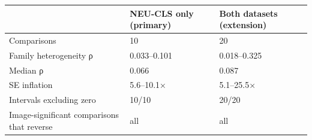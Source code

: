 \begin{tabular}{lll}
\toprule
 & NEU-CLS only (primary) & Both datasets (extension) \\
\midrule
Comparisons & 10 & 20 \\
Family heterogeneity ρ & 0.033–0.101 & 0.018–0.325 \\
Median ρ & 0.066 & 0.087 \\
SE inflation & 5.6–10.1× & 5.1–25.5× \\
Intervals excluding zero & 10/10 & 20/20 \\
Image-significant comparisons that reverse & all & all \\
\bottomrule
\end{tabular}
